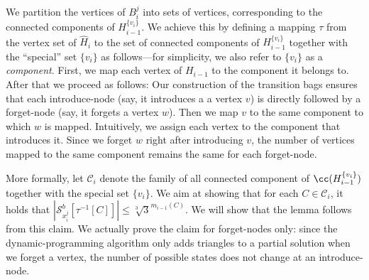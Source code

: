 \documentclass[a4paper,UKenglish,cleveref, autoref, thm-restate]{lipics-v2021}
\begin{document}
We partition the vertices of $B_i^j$ into sets of vertices, corresponding to the connected components of $H_{i-1}^{\{v_i\}}$. 
We achieve this by defining a mapping $\tau$ from the vertex set of $\hat{H}_i$ to the set of connected components of $H_{i-1}^{\{v_i\}}$ together with the ``special'' set $\{v_i\}$ as follows---for simplicity, we also refer to $\{v_i\}$ as a \emph{component}.
First, we map each vertex of $H_{i-1}$ to the component it belongs to. 
After that we proceed as follows:
Our construction of the transition bags ensures that each introduce-node (say, it introduces a a vertex $v$) is directly followed by a forget-node (say, it forgets a vertex $w$). 
Then we map $v$ to the same component to which $w$ is mapped. Intuitively, we assign each vertex to the component that introduces it. 
Since we forget $w$ right after introducing $v$, the number of vertices mapped to the same component remains the same for each forget-node.

More formally, let $\mathcal{C}_i$ denote the family of all connected component of $\cc(H_{i-1}^{\{v_i\}})$ together with the special set $\{v_i\}$. 
We aim at showing that for each $C\in\mathcal{C}_i$, it holds that 
$|\mathcal{S}_{x_i^j}^b[\tau^{-1}[C]]| \leq \sqrt[3]{3}^{m_{i-1}(C)}$.
We will show that the lemma follows from this claim.
We actually prove the claim for forget-nodes only: since the dynamic-programming algorithm only adds triangles to a partial solution when we forget a vertex, the number of possible states does not change at an introduce-node. 
\end{document}
